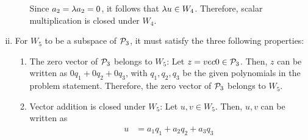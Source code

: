 \begin{sol}
\begin{enumerate}[(i)]
\begin{enumerate}[(1)]
\[                        \]
                        Since $a_2=\lam a_2=0$, it follows that $\lam u\in W_4$. Therefore, scalar multiplication is closed under $W_4$.
              \end{enumerate}
        \item For $W_5$ to be a subspace of $\P_3$, it must satisfy the three following properties:
              \begin{enumerate}[(1)]
                  \item The zero vector of $\P_3$ belongs to $W_5$: Let $z=vec{0}\in\P_3$. Then, $z$ can be written as $0q_1+0q_2+0q_3$, with $q_1,q_2,q_3$ be the given polynomials in the problem statement. Therefore, the zero vector of $\P_3$ belongs to $W_5$.
                  \item Vector addition is closed under $W_5$: Let $u,v\in W_5$. Then, $u,v$ can be written as
                        \[
                            \begin{aligned}
                                u & = a_1q_1+a_2q_2+a_3q_3 \\
                            \end{aligned}
                        \]
              \end{enumerate}
    \end{enumerate}
\end{sol}